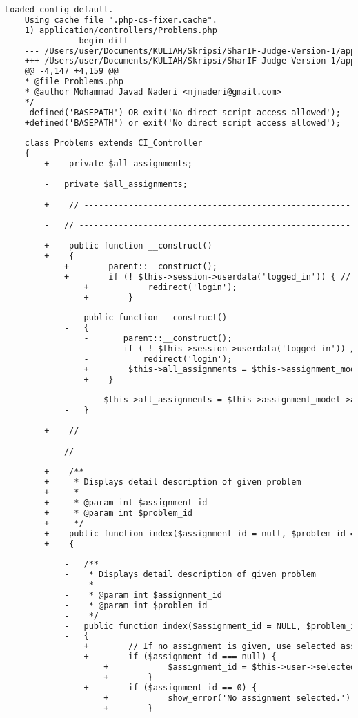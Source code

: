 \begin{lstlisting}[language=diff, caption=Perubahan pada kode Problems.php]
	Loaded config default.
	Using cache file ".php-cs-fixer.cache".
	1) application/controllers/Problems.php
	---------- begin diff ----------
	--- /Users/user/Documents/KULIAH/Skripsi/SharIF-Judge-Version-1/application/controllers/Problems.php
	+++ /Users/user/Documents/KULIAH/Skripsi/SharIF-Judge-Version-1/application/controllers/Problems.php
	@@ -4,147 +4,159 @@
	* @file Problems.php
	* @author Mohammad Javad Naderi <mjnaderi@gmail.com>
	*/
	-defined('BASEPATH') OR exit('No direct script access allowed');
	+defined('BASEPATH') or exit('No direct script access allowed');
	
	class Problems extends CI_Controller
	{
		+    private $all_assignments;
		
		-	private $all_assignments;
		
		+    // ------------------------------------------------------------------------
		
		-	// ------------------------------------------------------------------------
		
		+    public function __construct()
		+    {
			+        parent::__construct();
			+        if (! $this->session->userdata('logged_in')) { // if not logged in
				+            redirect('login');
				+        }
			
			-	public function __construct()
			-	{
				-		parent::__construct();
				-		if ( ! $this->session->userdata('logged_in')) // if not logged in
				-			redirect('login');
				+        $this->all_assignments = $this->assignment_model->all_assignments();
				+    }
			
			-		$this->all_assignments = $this->assignment_model->all_assignments();
			-	}
		
		+    // ------------------------------------------------------------------------
		
		-	// ------------------------------------------------------------------------
		
		+    /**
		+     * Displays detail description of given problem
		+     *
		+     * @param int $assignment_id
		+     * @param int $problem_id
		+     */
		+    public function index($assignment_id = null, $problem_id = 1)
		+    {
			
			-	/**
			-	 * Displays detail description of given problem
			-	 *
			-	 * @param int $assignment_id
			-	 * @param int $problem_id
			-	 */
			-	public function index($assignment_id = NULL, $problem_id = 1)
			-	{
				+        // If no assignment is given, use selected assignment
				+        if ($assignment_id === null) {
					+            $assignment_id = $this->user->selected_assignment['id'];
					+        }
				+        if ($assignment_id == 0) {
					+            show_error('No assignment selected.');
					+        }
				

\end{lstlisting}
